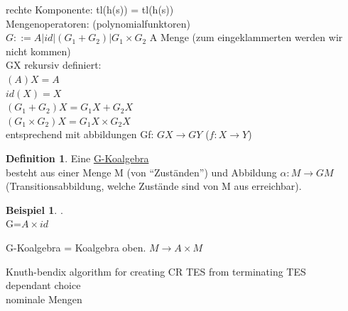 \documentclass{article}
\theoremstyle{definition}
\newtheorem{beispiel}{Beispiel}[section]
\newtheorem{definition}{Definition}[section]
\begin{document}
	rechte Komponente: tl(h(s)) = tl(h(s))\\
	Mengenoperatoren: (polynomialfunktoren)\\
	$G::=A|id|(G_1+G_2)|G_1\times G_2$ A Menge (zum eingeklammerten werden wir nicht kommen)\\
	GX rekursiv definiert:\\
	$(A)X=A$\\
	$id(X)=X$\\
	$(G_1+G_2)X = G_1X+G_2X$\\
	$(G_1\times G_2)X = G_1X\times G_2X$\\
	entsprechend mit abbildungen Gf: $GX\to GY$ ($f:X\to Y$)\\
	\begin{definition} Eine \underline{G-Koalgebra}\\
	besteht aus einer Menge M (von ``Zuständen'') und Abbildung $\alpha:M\to GM$ (Transitionsabbildung, welche Zustände sind von M aus erreichbar).\\
	\end{definition}
	\begin{beispiel}.\\
	G=$A\times id$
	\end{beispiel}
	G-Koalgebra = Koalgebra oben. $M\to A\times M$\\

	\newpage

	\begin{thebibliography}{1}
	Knuth-bendix algorithm for creating CR TES from terminating TES\\
	dependant choice\\
	nominale Mengen\\

	\end{thebibliography}
\end{document}
